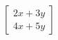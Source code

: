 \documentclass[preview]{standalone}
\begin{document}
\begin{align*}
\begin{bmatrix} 2x + 3y \\ 4x + 5y \end{bmatrix}
\end{align*}
\end{document}
